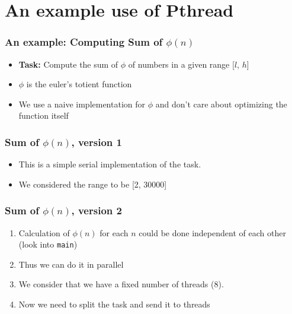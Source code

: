 \documentclass[aspectratio=43,11pt]{beamer}
\newenvironment{changemargin}[1]{%
  \begin{list}{}{%
    \setlength{\topsep}{0pt}%
    \setlength{\leftmargin}{#1}%
    \setlength{\rightmargin}{1em}
    \setlength{\listparindent}{\parindent}%
    \setlength{\itemindent}{\parindent}%
    \setlength{\parsep}{\parskip}%
  }%
  \item[]}{\end{list}}
\begin{document}
\section{An example use of Pthread}
\begin{frame}
  \sectionpage
\end{frame}
\begin{frame}
  \frametitle{An example: Computing Sum of $\phi(n)$}
  
  \begin{itemize}
    \item \textbf{Task:} Compute the sum of $\phi$ of numbers in a given range [$l$, $h$]
    \item $\phi$ is the euler's totient function
    \item We use a naive implementation for $\phi$ and don't care about optimizing the function itself
  \end{itemize}
\end{frame}
\begin{frame}
  \frametitle{Sum of $\phi(n)$, version 1}
  
  \begin{itemize}
    \item This is a simple serial implementation of the task.
    \item We considered the range to be [2, 30000]
  \end{itemize}
  
  \begin{changemargin}{0.5cm}
  
  \end{changemargin}
  \let\thefootnote\relax{}
\end{frame}
%
\begin{frame}
  \frametitle{Sum of $\phi(n)$, version 2}

  \begin{enumerate}
    \item Calculation of $\phi(n)$ for each $n$ could be done independent of each other (look into {\tt main})
    \item Thus we can do it in parallel
    \item We consider that we have a fixed number of threads (8).
    \item Now we need to split the task and send it to threads
  \end{enumerate}  
\end{frame}
\end{document}
